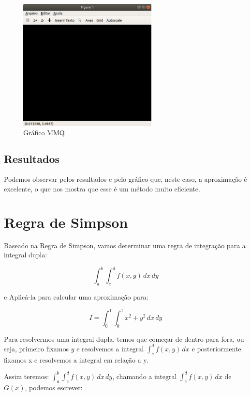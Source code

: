 \documentclass[11pt, openright, a4paper, brazil, openany, oneside]{abntex2}
\begin{document}
\begin{figure}[ht]

    \center

    \includegraphics[width=7cm]{grafico1.png}
    \caption{Gráfico MMQ \label{grafico1}}
    
\end{figure}



\section{Resultados}

Podemos observar pelos resultados e pelo gráfico que, neste caso, a aproximação é excelente, o que nos mostra que esse é um método muito eficiente.


\chapter{Regra de Simpson}



Baseado na Regra de Simpson, vamos determinar uma regra de integração para a integral dupla:

$$\int_a^b\int_c^d f(x,y)\, dx\, dy$$

e Aplicá-la para calcular uma aproximação para:

$$I=\int_0^1\int_0^1 x^2 + y^2\, dx\, dy$$

Para resolvermos uma integral dupla, temos que começar de dentro para fora, ou seja, primeiro fixamos $y$ e resolvemos a integral $\displaystyle\int_c^d f(x,y)\, dx$ e posteriormente fixamos x e resolvemos a integral em relação a y. 

Assim teremos: $\displaystyle\int_a^b\int_c^d f(x,y)\, dx\, dy$, chamando a integral $\displaystyle\int_c^d f(x,y)\, dx $ de $G(x)$, podemos escrever:
\end{document}

